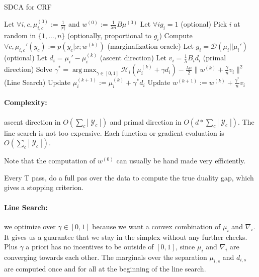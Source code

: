 \documentclass{article}
\DeclareMathOperator{\1}{\mathbb{1}}
\DeclareMathOperator{\Y}{\mathcal{Y}}
\DeclareMathOperator*{\argmax}{arg\,max}
\begin{document}
\begin{algorithm}[ht]
    \caption{SDCA for CRF}%
    \label{sdca for crf}
\begin{algorithmic}
        \STATE Let $\forall i, c, \mu_{i, c}^{(0)} := \frac{1}{|c|}$ and $w^{(0)} := \frac{1}{\lambda n} B \mu^{(0)} $
        \STATE Let $\forall i g_i = 1$ (optional)
                \STATE Pick $i$ at random in $\{1,\ldots,n\}$ (optionally, proportional to $g_i$)
                \STATE Compute $\forall c, \mu_{i, c}' (y_c) := p(y_c|x; w^{(k)})$ (marginalization oracle)
                \STATE Let $g_i = \mathcal D(\mu_i || \mu_i')$ (optional)
                \STATE Let $d_i = \mu_i' - \mu_i^{(k)}$ (ascent direction)
                \STATE Let $v_i = \frac{1}{\lambda} B_i d_i $ (primal direction)
                \STATE Solve $\gamma^* = \argmax_{\gamma \in [0,1]} \mathcal H_i(\mu_i^{(k)} + \gamma d_i) - \frac{\lambda n}{2} \| w^{(k)} + \frac{\gamma}{n} v_i \|^2$ (Line Search)
               \STATE Update $\mu_i^{(k+1)} := \mu_i^{(k)} + \gamma^* d_i$
               \STATE Update $w^{(k+1)} := w^{(k)} + \frac{\gamma^*}{n} v_i $
        \ENDFOR
\end{algorithmic}
\end{algorithm}

\paragraph{Complexity:} ascent direction in $O(\sum_c |\Y_c|)$ and primal direction in $O(d*\sum_c |\Y_c|)$.
The line search is not too expensive.
Each function or gradient evaluation is $O(\sum_c |\Y_c|)$.

Note that the computation of $w^{(0)}$ can usually be hand made very efficiently.

Every T pass, do a full pas over the data to compute the true duality gap, which gives a stopping criterion.

\paragraph{Line Search:} we optimize over $\gamma \in [0,1]$ because we want a convex combination of $\mu_i$ and $\nabla_i$.
It gives us a guarantee that we stay in the simplex without any further checks.
Plus $\gamma$ a priori has no incentives to be outside of $[0,1]$, since $\mu_i$ and $\nabla_i$ are converging towards each other.
The marginals over the separation $\mu_{i, s}$ and $d_{i, s}$ are computed once and for all at the beginning of the line search.
\end{document}
